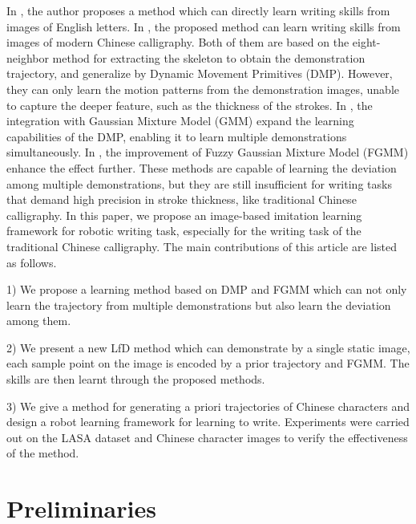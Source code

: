 \documentclass[conference]{IEEEtran}
\begin{document}
In \cite{Zhang2023}, the author proposes a method which can directly learn writing skills from images of English letters. In \cite{Li2021,Li2022,Li2024}, the proposed method can learn writing skills from images of modern Chinese calligraphy. Both of them are based on the eight-neighbor method for extracting the skeleton to obtain the demonstration trajectory, and generalize by Dynamic Movement Primitives (DMP)\cite{Ijspeert2013}. However, they can only learn the motion patterns from the demonstration images, unable to capture the deeper feature, such as the thickness of the strokes. In \cite{Yang2019}, the integration with Gaussian Mixture Model (GMM) expand the learning capabilities of the DMP, enabling it to learn multiple demonstrations simultaneously. In \cite{Yang2019c}, the improvement of Fuzzy Gaussian Mixture Model (FGMM)\cite{Ju2012} enhance the effect further. These methods are capable of learning the deviation among multiple demonstrations, but they are still insufficient for writing tasks that demand high precision in stroke thickness, like traditional Chinese calligraphy. In this paper, we propose an image-based imitation learning framework for robotic writing task, especially for the writing task of the traditional Chinese calligraphy. The main contributions of this article are listed as follows. 

1) We propose a learning method based on DMP and FGMM which can not only learn the trajectory from multiple demonstrations but also learn the deviation among them.

2) We present a new LfD method which can demonstrate by a single static image, each sample point on the image is encoded by a prior trajectory and FGMM. The skills are then learnt through the proposed methods.

3) We give a method for generating a priori trajectories of Chinese characters and design a robot learning framework for learning to write. Experiments were carried out on the LASA dataset and Chinese character images to verify the effectiveness of the method.

\section{Preliminaries}
\end{document}
